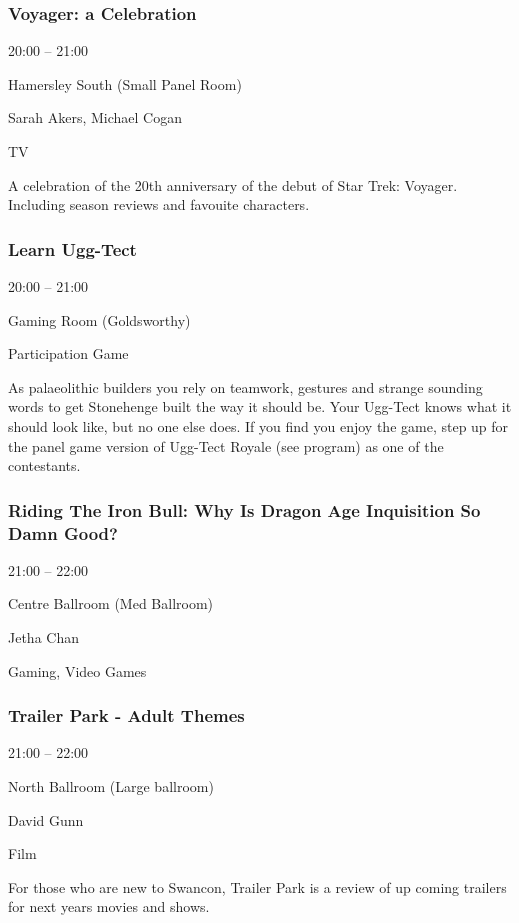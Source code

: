 \documentclass{scrreprt}
\begin{document}
\begin{multicols}{2}
\subsubsection*{Voyager: a Celebration}\begin{description}
\setlength{\itemsep}{0pt}
\setlength{\parsep}{0pt}
\setlength{\parskip}{0pt}
\item[Time:]{20:00 -- 21:00}
\item[Venue:]{Hamersley South (Small Panel Room)}
\item[People:]{Sarah Akers, Michael Cogan}
\item[Tags:]{TV}\end{description}
A celebration of the 20th anniversary of the debut of Star Trek: Voyager. Including season reviews and favouite characters.
\subsubsection*{Learn Ugg-Tect}\begin{description}
\setlength{\itemsep}{0pt}
\setlength{\parsep}{0pt}
\setlength{\parskip}{0pt}
\item[Time:]{20:00 -- 21:00}
\item[Venue:]{Gaming Room (Goldsworthy)}
\item[Tags:]{Participation Game}\end{description}
As palaeolithic builders you rely on teamwork, gestures and strange sounding words to get Stonehenge built the way it should be. Your Ugg-Tect knows what it should look like, but no one else does.  If you find you enjoy the game, step up for the panel game version of Ugg-Tect Royale (see program) as one of the contestants.
\subsubsection*{Riding The Iron Bull: Why Is Dragon Age Inquisition So Damn Good?}\begin{description}
\setlength{\itemsep}{0pt}
\setlength{\parsep}{0pt}
\setlength{\parskip}{0pt}
\item[Time:]{21:00 -- 22:00}
\item[Venue:]{Centre Ballroom (Med Ballroom)}
\item[People:]{Jetha Chan}
\item[Tags:]{Gaming, Video Games}\end{description}

\subsubsection*{Trailer Park - Adult Themes}\begin{description}
\setlength{\itemsep}{0pt}
\setlength{\parsep}{0pt}
\setlength{\parskip}{0pt}
\item[Time:]{21:00 -- 22:00}
\item[Venue:]{North Ballroom (Large ballroom)}
\item[People:]{David Gunn}
\item[Tags:]{Film}\end{description}
For those who are new to Swancon, Trailer Park is a review of up coming trailers for next years movies and shows.

\end{multicols}
\end{document}
